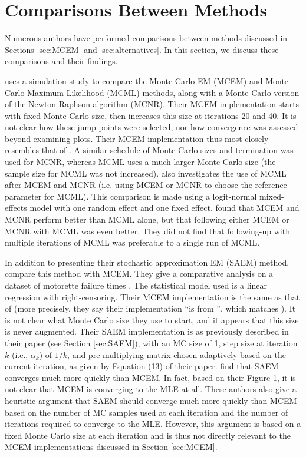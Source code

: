 \documentclass[ss]{imsart}
\theoremstyle{plain}
\theoremstyle{definition}
\theoremstyle{remark}
\begin{document}
\section{Comparisons Between Methods}
\label{sec:comparison}


Numerous authors have performed comparisons between methods discussed in Sections \ref{sec:MCEM} and \ref{sec:alternatives}. In this section, we discuss these comparisons and their findings.

\citet{McC97} uses a simulation study to compare the Monte Carlo EM (MCEM) and Monte Carlo Maximum Likelihood (MCML) methods, along with a Monte Carlo version of the Newton-Raphson algorithm (MCNR). Their MCEM implementation starts with fixed Monte Carlo size, then increases this size at iterations 20 and 40. It is not clear how these jump points were selected, nor how convergence was assessed beyond examining plots. Their MCEM implementation thus most closely resembles that of \citet{Wei90}. A similar schedule of Monte Carlo sizes and termination was used for MCNR, whereas MCML uses a much larger Monte Carlo size (the sample size for MCML was not increased). \citeauthor{McC97} also investigates the use of MCML after MCEM and MCNR (i.e. using MCEM or MCNR to choose the reference parameter for MCML). This comparison is made using a logit-normal mixed-effects model with one random effect and one fixed effect. \citeauthor{McC97} found that MCEM and MCNR perform better than MCML alone, but that following either MCEM or MCNR with MCML was even better. They did not find that following-up with multiple iterations of MCML was preferable to a single run of MCML.

In addition to presenting their stochastic approximation EM (SAEM) method, \citet{Gu98I} compare this method with MCEM. They give a comparative analysis on a dataset of motorette failure times \citep[see][for a diagram and explanation of what a motorette is]{Rai16}. The statistical model used is a linear regression with right-censoring. Their MCEM implementation is the same as that of \citet{Wei90} (more precisely, they say their implementation ``is from \citet{Tan93}'', which matches \citeauthor{Wei90}). It is not clear what Monte Carlo size they use to start, and it appears that this size is never augmented. Their SAEM implementation is as previously described in their paper (see Section \ref{sec:SAEM}), with an MC size of 1, step size at iteration $k$ (i.e., $\alpha_k$) of $1/k$, and pre-multiplying matrix chosen adaptively based on the current iteration, as given by Equation (13) of their paper. \citeauthor{Gu98I} find that SAEM converges much more quickly than MCEM. In fact, based on their Figure 1, it is not clear that MCEM is converging to the MLE at all. These authors also give a heuristic argument that SAEM should converge much more quickly than MCEM based on the number of MC samples used at each iteration and the number of iterations required to converge to the MLE. However, this argument is based on a fixed Monte Carlo size at each iteration and is thus not directly relevant to the MCEM implementations discussed in Section \ref{sec:MCEM}.
\end{document}
